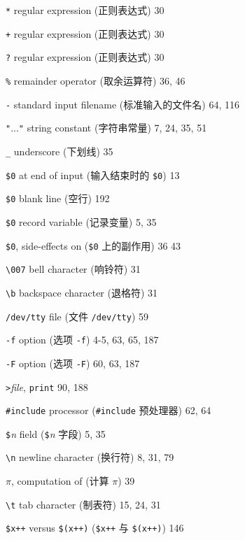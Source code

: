\begin{multicols}{2}
\hangindent=2pc  \verb'*' regular expression (正则表达式) 30

\hangindent=2pc  \verb'+' regular expression (正则表达式) 30

\hangindent=2pc  \verb'?' regular expression (正则表达式) 30

\hangindent=2pc  \verb'%' remainder operator (取余运算符) 36, 46

\hangindent=2pc  \verb'-' standard input filename
(标准输入的文件名) 64, 116

\hangindent=2pc  \verb'"'...\verb'"' string constant
(字符串常量) 7, 24, 35, 51

\hangindent=2pc  \verb'_' underscore (下划线) 35

\hangindent=2pc  \verb'$0' at end of input (输入结束时的
\verb'$0') 13

\hangindent=2pc  \verb'$0' blank line (空行) 192

\hangindent=2pc  \verb'$0' record variable (记录变量) 5, 35

\hangindent=2pc  \verb'$0', side-effects on (\verb'$0' 上的副作用)
36 43

\hangindent=2pc  \verb'\007' bell character (响铃符) 31

\hangindent=2pc  \verb'\b' backspace character (退格符) 31

\hangindent=2pc  \verb'/dev/tty' file (文件 \verb'/dev/tty') 59

\hangindent=2pc  \verb'-f' option (选项 \verb'-f') 4-5, 63, 65, 187

\hangindent=2pc  \verb'-F' option (选项 \verb'-F') 60, 63, 187

\hangindent=2pc  \verb'>'\textit{file}, \verb'print' 90, 188

\hangindent=2pc  \verb'#include' processor (\verb'#include'
预处理器) 62, 64

\hangindent=2pc  \verb'$'\textit{n} field (\verb'$'\textit{n}
字段) 5, 35

\hangindent=2pc  \verb'\n' newline character (换行符) 8, 31, 79

\hangindent=2pc  $\pi$, computation of (计算 $\pi$) 39

\hangindent=2pc  \verb'\t' tab character (制表符) 15, 24, 31

\hangindent=2pc  \verb'$x++' versus \verb'$(x++)' (\verb'$x++'
与 \verb'$(x++)') 146


\end{multicols}
